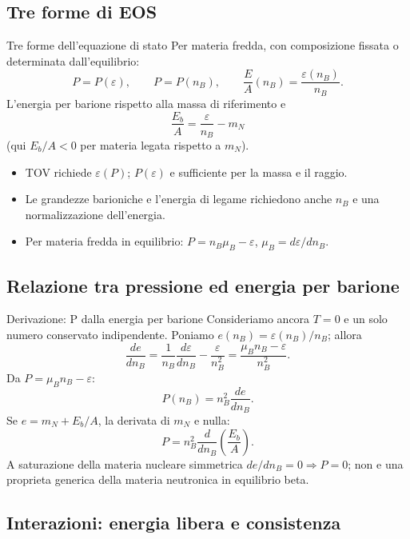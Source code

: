 \subsection{Tre forme di EOS}

\begin{frame}[t]{Tre forme dell'equazione di stato}
\vspace*{3mm}
\small
Per materia fredda, con composizione fissata o determinata dall'equilibrio:
\[
P=P(\varepsilon),\qquad P=P(n_B),\qquad
\frac EA(n_B)=\frac{\varepsilon(n_B)}{n_B}.
\]
L'energia per barione rispetto alla massa di riferimento e
\[
\frac{E_b}{A}=\frac{\varepsilon}{n_B}-m_N
\]
(qui $E_b/A<0$ per materia legata rispetto a $m_N$).
\begin{itemize}
\item TOV richiede $\varepsilon(P)$; $P(\varepsilon)$ e sufficiente per la massa e il raggio.
\item Le grandezze barioniche e l'energia di legame richiedono anche $n_B$ e una normalizzazione dell'energia.
\item Per materia fredda in equilibrio: $P=n_B\mu_B-\varepsilon$, $\mu_B=d\varepsilon/dn_B$.
\end{itemize}
\end{frame}

\subsection{Relazione tra pressione ed energia per barione}

\begin{frame}[t]{Derivazione: P dalla energia per barione}
\vspace*{3mm}
\small
Consideriamo ancora $T=0$ e un solo numero conservato indipendente.
Poniamo $e(n_B)=\varepsilon(n_B)/n_B$; allora
\[
\frac{de}{dn_B}
=\frac1{n_B}\frac{d\varepsilon}{dn_B}-\frac{\varepsilon}{n_B^2}
=\frac{\mu_B n_B-\varepsilon}{n_B^2}.
\]
Da $P=\mu_B n_B-\varepsilon$:
\[
\boxed{P(n_B)=n_B^2\frac{de}{dn_B}.}
\]
Se $e=m_N+E_b/A$, la derivata di $m_N$ e nulla:
\[
P=n_B^2\frac{d}{dn_B}\left(\frac{E_b}{A}\right).
\]
A saturazione della materia nucleare simmetrica $de/dn_B=0\Rightarrow P=0$; non e una proprieta generica della materia neutronica in equilibrio beta.
\end{frame}

\subsection{Interazioni: energia libera e consistenza}

